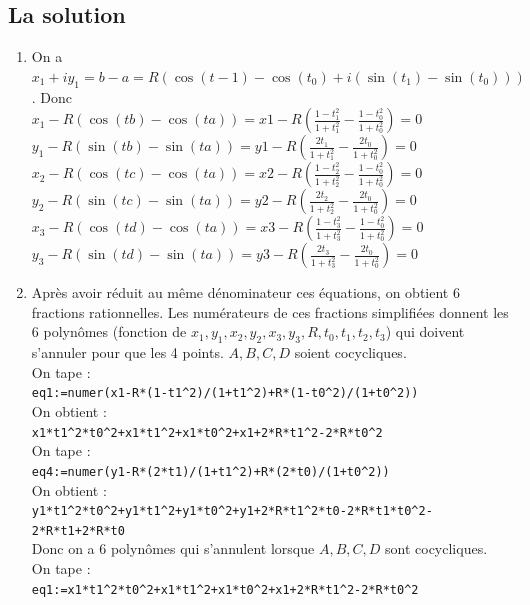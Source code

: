 \documentclass[a4paper,11pt]{book}
\begin{document}
\subsection{La solution}
\begin{enumerate}
\item On a  $x_1+iy_1=b-a=R(\cos(t-1)-\cos(t_0)+i(\sin(t_1)-\sin(t_0)))$.
Donc \\
$\displaystyle x_1-R(\cos(tb)-\cos(ta))=x1-R(\frac{1-t_1^2}{1+t_1^2}-\frac{1-t_0^2}{1+t_0^2})=0$\\
$\displaystyle y_1-R(\sin(tb)-\sin(ta))=y1-R(\frac{2t_1}{1+t_1^2}-\frac{2t_0}{1+t_0^2})=0$\\
$\displaystyle x_2-R(\cos(tc)-\cos(ta))=x2-R(\frac{1-t_2^2}{1+t_2^2}-\frac{1-t_0^2}{1+t_0^2})=0$\\
$\displaystyle y_2-R(\sin(tc)-\sin(ta))=y2-R(\frac{2t_2}{1+t_2^2}-\frac{2t_0}{1+t_0^2})=0$\\
$\displaystyle x_3-R(\cos(td)-\cos(ta))=x3-R(\frac{1-t_3^2}{1+t_3^2}-\frac{1-t_0^2}{1+t_0^2})=0$\\
$\displaystyle y_3-R(\sin(td)-\sin(ta))=y3-R(\frac{2t_3}{1+t_3^2}-\frac{2t_0}{1+t_0^2})=0$
\item Apr\`es avoir r\'eduit au m\^eme d\'enominateur ces \'equations, on 
obtient 6 fractions rationnelles. Les num\'erateurs de ces fractions 
simplifi\'ees donnent les 6 polyn\^omes (fonction de $x_1,y_1,x_2,y_2,x_3,y_3,R,t_0,t_1,t_2,t_3$) qui doivent s'annuler pour que les  4 points. 
$A,B,C,D$ soient cocycliques.\\
On tape :\\
{\tt eq1:=numer(x1-R*(1-t1\verb|^|2)/(1+t1\verb|^|2)+R*(1-t0\verb|^|2)/(1+t0\verb|^|2))}\\
On obtient :\\
{\tt x1*t1\verb|^|2*t0\verb|^|2+x1*t1\verb|^|2+x1*t0\verb|^|2+x1+2*R*t1\verb|^|2-2*R*t0\verb|^|2}\\
On tape :\\
{\tt eq4:=numer(y1-R*(2*t1)/(1+t1\verb|^|2)+R*(2*t0)/(1+t0\verb|^|2))}\\
On obtient :\\
{\tt y1*t1\verb|^|2*t0\verb|^|2+y1*t1\verb|^|2+y1*t0\verb|^|2+y1+2*R*t1\verb|^|2*t0-2*R*t1*t0\verb|^|2- 2*R*t1+2*R*t0}\\
Donc on a 6 polyn\^omes qui s'annulent lorsque $A,B,C,D$ sont cocycliques.\\
On tape :\\
{\tt eq1:=x1*t1\verb|^|2*t0\verb|^|2+x1*t1\verb|^|2+x1*t0\verb|^|2+x1+2*R*t1\verb|^|2-2*R*t0\verb|^|2}\\

\end{enumerate}
\end{document}
